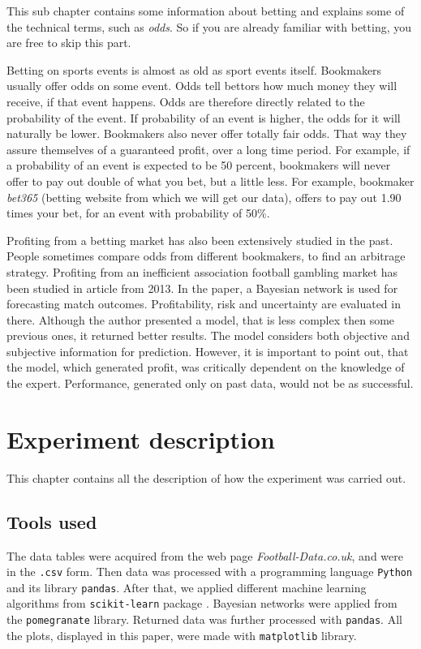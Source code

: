 \documentclass[conference]{IEEEtran}
\begin{document}
This sub chapter contains some information about betting and explains some of the 
technical terms, such as \textit{odds}. So if you are already familiar with betting, 
you are free to skip this part.

Betting on sports events is almost as old as sport events itself. Bookmakers usually 
offer odds on some event. Odds tell bettors how much money they will receive, if that 
event happens. Odds are therefore directly related to the probability of the event. If 
probability of an event is higher, the odds for it will naturally be lower. Bookmakers also
never offer totally fair odds. That way they assure themselves of a guaranteed profit, over 
a long time period. For example, if a probability of an event is expected to be 50 percent,
bookmakers will never offer to pay out double of what you bet, but a little less. For example,
bookmaker \textit{bet365} (betting website from which we will get our data), offers to pay out
1.90 times your bet, for an event with probability of 50\%. 

Profiting from a betting market has also been extensively studied in the past. People sometimes
compare odds from different bookmakers, to find an arbitrage strategy. Profiting from an 
inefficient association football gambling market has been studied in article 
\cite{Constantinou_2013} from 2013. In the paper, a Bayesian network is used for forecasting
match outcomes. Profitability, risk and uncertainty are evaluated in there. Although the author
presented a model, that is less complex then some previous ones, it returned better results.
The model considers both objective and subjective information for prediction.  However, it is
important to point out, that the model, which generated profit, was critically dependent on the
knowledge of the expert. Performance, generated only on past data, would not be as successful.

\section{Experiment description}

This chapter contains all the description of how the experiment was carried out.

\subsection{Tools used}

The data tables were acquired from the web page \emph{Football-Data.co.uk}, and were in the
\texttt{.csv} form. Then data was processed with a programming language \texttt{Python} and 
its library \texttt{pandas}. After that, we applied different machine learning algorithms from
\texttt{scikit-learn} package \cite{scikit-learn}. Bayesian networks were applied 
from the \texttt{pomegranate} library. Returned data was further processed 
with \texttt{pandas}. All the plots, displayed in this paper, were made with 
\texttt{matplotlib} library.
\end{document}
